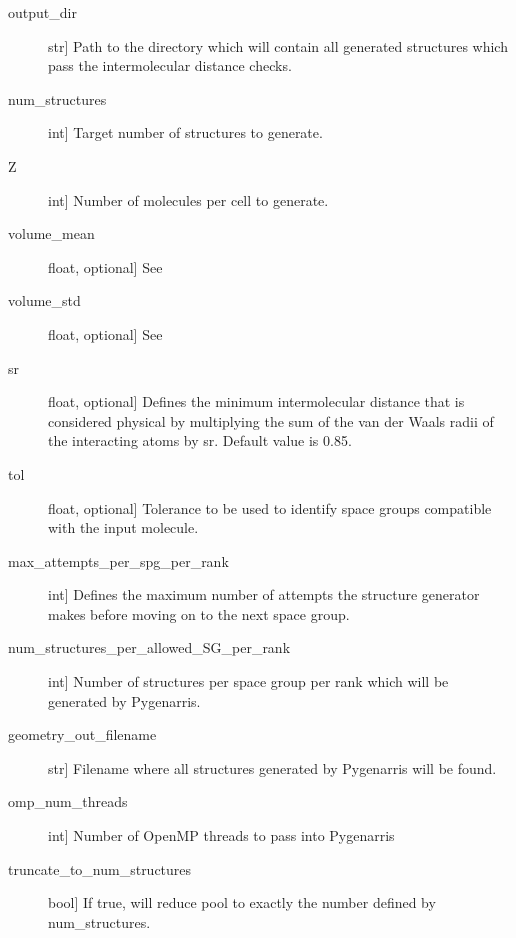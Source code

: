 \documentclass[letterpaper,10pt,english]{sphinxmanual}
\begin{document}
\begin{fulllineitems}
\begin{fulllineitems}
\begin{description}
\item[{output\_dir}] \leavevmode{[}str{]}
Path to the directory which will contain all generated structures
which pass the intermolecular distance checks.

\item[{num\_structures}] \leavevmode{[}int{]}
Target number of structures to generate.

\item[{Z}] \leavevmode{[}int{]}
Number of molecules per cell to generate.

\item[{volume\_mean}] \leavevmode{[}float, optional{]}
See {\hyperref[\detokenize{index:Genarris.genarris_master.Genarris.Estimate_Unit_Cell_Volume}]{}}

\item[{volume\_std}] \leavevmode{[}float, optional{]}
See {\hyperref[\detokenize{index:Genarris.genarris_master.Genarris.Estimate_Unit_Cell_Volume}]{}}

\item[{sr}] \leavevmode{[}float, optional{]}
Defines the minimum intermolecular distance that is considered
physical by multiplying the sum of the van der Waals radii of the
interacting atoms by sr. Default value is 0.85.

\item[{tol}] \leavevmode{[}float, optional{]}
Tolerance to be used to identify space groups compatible with the
input molecule.

\item[{max\_attempts\_per\_spg\_per\_rank}] \leavevmode{[}int{]}
Defines the maximum number of attempts the structure generator
makes before moving on to the next space group.

\item[{num\_structures\_per\_allowed\_SG\_per\_rank}] \leavevmode{[}int{]}
Number of structures per space group per rank which will be
generated by Pygenarris.

\item[{geometry\_out\_filename}] \leavevmode{[}str{]}
Filename where all structures generated by Pygenarris will be found.

\item[{omp\_num\_threads}] \leavevmode{[}int{]}
Number of OpenMP threads to pass into Pygenarris

\item[{truncate\_to\_num\_structures}] \leavevmode{[}bool{]}
If true, will reduce pool to exactly the number defined by
num\_structures.


\end{description}
\end{fulllineitems}
\end{fulllineitems}
\end{document}
